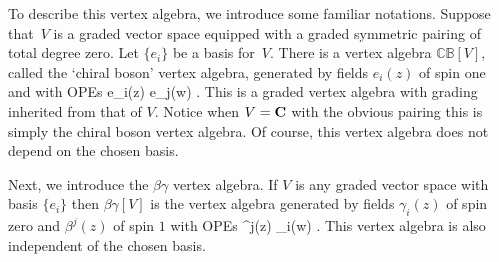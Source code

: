 \documentclass[11pt]{amsart}
\newcommand{\CB}{\mathbb{C}\mathbb{B}}
\begin{document}
To describe this vertex algebra, we introduce some familiar notations.
Suppose that~$V$ is a graded vector space equipped with a graded symmetric pairing of total degree zero.
Let $\{e_i\}$ be a basis for~$V$.
There is a vertex algebra $\CB[V]$, called the `chiral boson' vertex algebra, generated by fields $e_i(z)$ of spin one and with OPEs
\beqn
e_i(z) e_j(w) \simeq {} .
\eeqn
This is a graded vertex algebra with grading inherited from that of $V$.
Notice when $V = \mathbf{C}$ with the obvious pairing this is simply the chiral boson vertex algebra.
Of course, this vertex algebra does not depend on the chosen basis.

Next, we introduce the $\beta\gamma$ vertex algebra.
If $V$ is any graded vector space with basis $\{e_i\}$ then $\beta\gamma[V]$ is the vertex algebra generated by fields $\gamma_i(z)$ of spin zero and $\beta^j(z)$ of spin $1$ with OPEs
\beqn
\beta^j(z) \gamma_i(w) \simeq {} .
\eeqn
This vertex algebra is also independent of the chosen basis.
\end{document}
